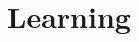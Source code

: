 \documentclass[xcolor=x11names,compress, aspectratio=169]{beamer}
\renewcommand{\(}{\begin{columns}}
\renewcommand{\)}{\end{columns}}
\newcommand{\<}[1]{\begin{column}{#1}}
\renewcommand{\>}{\end{column}}
\begin{document}


%
%
%
%
%
%
%
%
%
%
%
%
%


\section{Learning}
\end{document}
